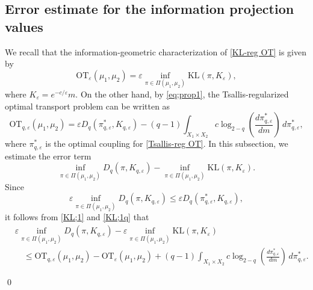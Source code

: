 \documentclass[a4paper,11pt]{article}
\theoremstyle{plain}
\theoremstyle{definition}
\theoremstyle{remark}
\theoremstyle{plain}
\newenvironment{pf}[1]
{{\noindent\textbf{Proof of #1.}}}{\hfill \qed}
\numberwithin{equation}{section}
\newcommand{\ep}{\varepsilon}
\newcommand{\1}{\mbox{1}\hspace{-0.25em}\mbox{l}} %
\begin{document}
\subsection{Error estimate for the information projection values}
\begin{pf}{Theorem \ref{thm;3}}

We recall that the information-geometric characterization of \eqref{KL-reg OT} is given by
\begin{equation}\label{KL;1}
  \mathrm{OT}_\ep(\mu_1, \mu_2)
  = \ep \inf_{\pi \in \Pi(\mu_1, \mu_2)} \mathrm{KL}(\pi, K_\ep),
\end{equation}
where $K_\ep = e^{-c/\ep} m$. On the other hand, by \eqref{eq;prop1}, the Tsallis-regularized optimal transport problem can be written as
\begin{equation}\label{KL;1q}
  \mathrm{OT}_{q,\ep}(\mu_1, \mu_2)
  = \ep D_q(\pi_{q,\ep}^*, K_{q,\ep})
    - (q-1)\int_{X_1 \times X_2}
    c \log_{2-q}\left(\frac{d\pi_{q,\ep}^*}{dm}\right)\, d\pi_{q,\ep}^*,
\end{equation}
where $\pi_{q,\ep}^*$ is the optimal coupling for \eqref{Tsallis-reg OT}. In this subsection, we estimate the error term
\begin{equation*}
  \inf_{\pi \in \Pi(\mu_1, \mu_2)} D_q(\pi, K_{q,\ep})
  -
  \inf_{\pi \in \Pi(\mu_1, \mu_2)} \mathrm{KL}(\pi, K_\ep).
\end{equation*}
Since
\begin{equation*}
  \ep \inf_{\pi \in \Pi(\mu_1, \mu_2)} D_q(\pi, K_{q,\ep})
  \leq \ep D_q(\pi_{q,\ep}^*, K_{q,\ep}),
\end{equation*}
it follows from \eqref{KL;1} and \eqref{KL;1q} that
\begin{equation}\label{KL;2}
\begin{split}
  &\ep \inf_{\pi \in \Pi(\mu_1, \mu_2)} D_q(\pi, K_{q,\ep})
  - \ep \inf_{\pi \in \Pi(\mu_1, \mu_2)} \mathrm{KL}(\pi, K_\ep) \\
  &\quad \leq \mathrm{OT}_{q,\ep}(\mu_1, \mu_2) - \mathrm{OT}_\ep(\mu_1, \mu_2)
  + (q-1)\int_{X_1 \times X_2}
    c \log_{2-q}\left(\frac{d\pi_{q,\ep}^*}{dm}\right)\, d\pi_{q,\ep}^*.
\end{split}
\end{equation}


\end{pf}
\end{document}
